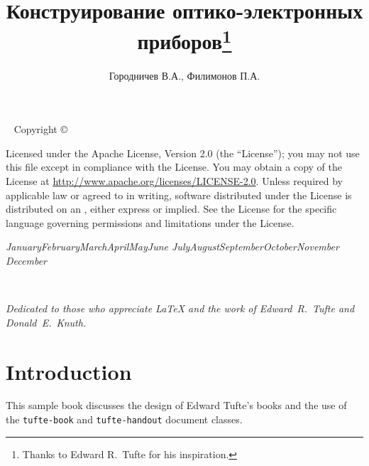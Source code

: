 \documentclass{tufte-book}
\title{Конструирование оптико-электронных приборов\thanks{Thanks to Edward R.~Tufte for his inspiration.}}
\author[Городничев В.А., Филимонов П.А.]{Городничев В.А., Филимонов П.А.}
\newcommand{\monthyear}{%
  \ifcase\month\or January\or February\or March\or April\or May\or June\or
  July\or August\or September\or October\or November\or
  December\fi\space\number\year
}
\newcommand{\doccls}[1]{\texttt{#1}}%
\begin{document}
\frontmatter

\maketitle


\newpage
\begin{fullwidth}
~\vfill
\thispagestyle{empty}
\setlength{\parindent}{0pt}
\setlength{\parskip}{\baselineskip}
Copyright \copyright\ \the\year\ \thanklessauthor

\par\smallcaps{\thanklesspublisher}

\par{}

\par Licensed under the Apache License, Version 2.0 (the ``License''); you may not
use this file except in compliance with the License. You may obtain a copy
of the License at \url{http://www.apache.org/licenses/LICENSE-2.0}. Unless
required by applicable law or agreed to in writing, software distributed
under the License is distributed on an , either express or implied. See the
License for the specific language governing permissions and limitations
under the License.

\par\textit{\monthyear}
\end{fullwidth}

\tableofcontents

\listoffigures

\listoftables

\cleardoublepage
~\vfill
\begin{doublespace}
\noindent\fontsize{18}{22}\selectfont\itshape
\nohyphenation
Dedicated to those who appreciate \LaTeX{} 
and the work of \mbox{Edward R.~Tufte} 
and \mbox{Donald E.~Knuth}.
\end{doublespace}
\vfill
\vfill


\cleardoublepage
\chapter*{Introduction}

This sample book discusses the design of Edward Tufte's
books\cite{Tufte2001,Tufte1990,Tufte1997,Tufte2006}
and the use of the \doccls{tufte-book} and \doccls{tufte-handout} document classes.
\end{document}
